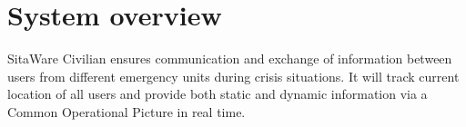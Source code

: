 \section{System overview}

SitaWare Civilian ensures communication and exchange of information between users from different emergency units during crisis situations. It will track current location of all users and provide both static and dynamic information via a Common Operational Picture in real time.